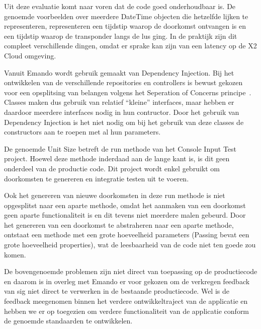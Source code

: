 Uit deze evaluatie komt naar voren dat de code goed onderhoudbaar is. De genoemde voorbeelden over meerdere DateTime objecten die hetzelfde lijken te representeren, representeren een tijdstip waarop de doorkomst ontvangen is en een tijdstip waarop de transponder langs de lus ging. In de praktijk zijn dit compleet verschillende dingen, omdat er sprake kan zijn van een latency op de \mylaps X2 Cloud omgeving. 

Vanuit Emando wordt gebruik gemaakt van Dependency Injection. Bij het ontwikkelen van de verschillende repositories en controllers is bewust gekozen voor een opsplitsing van belangen volgens het Seperation of Concerns principe~\cite{hursch95separationof, msdnsoc}. Classes maken dus gebruik van relatief ``kleine'' interfaces, maar hebben er daardoor meerdere interfaces nodig in hun contructor. Door het gebruik van Dependency Injection is het niet nodig om bij het gebruik van deze classes de constructors aan te roepen met al hun parameters. 


De genoemde Unit Size betreft de run methode van het Console Input Test project. Hoewel deze methode inderdaad aan de lange kant is, is dit geen onderdeel van de productie code. Dit project wordt enkel gebruikt om doorkomsten te genereren en integratie testen uit te voeren.

Ook het genereren van nieuwe doorkomsten in deze run methode is niet opgesplitst naar een aparte methode, omdat het aanmaken van een doorkomst geen aparte functionaliteit is en dit tevens niet meerdere malen gebeurd. Door het genereren van een doorkomst te abstraheren naar een aparte methode, ontstaat een methode met een grote hoeveelheid parameters (Passing bevat een grote hoeveelheid properties), wat de leesbaarheid van de code niet ten goede zou komen.

De bovengenoemde problemen zijn niet direct van toepassing op de productiecode en daarom is in overleg met Emando er voor gekozen om de verkregen feedback van \ac{sig} niet direct te verwerken in de bestaande productiecode. Wel is de feedback meegenomen binnen het verdere ontwikkeltraject van de applicatie en hebben we er op toegezien om verdere functionaliteit van de applicatie conform de genoemde standaarden te ontwikkelen.